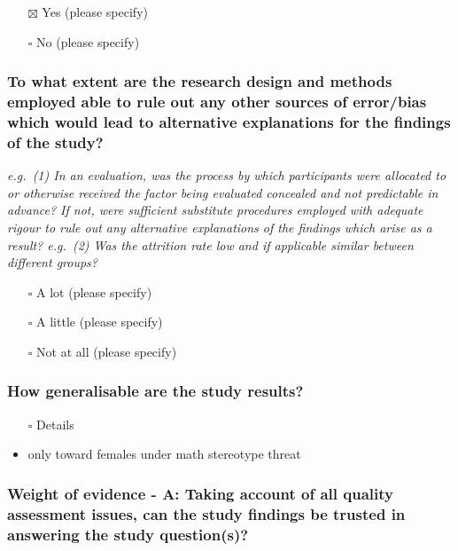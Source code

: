 \documentclass[
  doc, a4paper]{apa7}
\providecommand{\tightlist}{%
  \setlength{\itemsep}{0pt}\setlength{\parskip}{0pt}}
\begin{document}
\begin{itemize}
\tightlist
\item[$\boxtimes$]
  Yes (please specify)
\item[$\square$]
  No (please specify)
\end{itemize}

\subsubsection{To what extent are the research design and methods employed able to rule out any other sources of error/bias which would lead to alternative explanations for the findings of the study?}\label{to-what-extent-are-the-research-design-and-methods-employed-able-to-rule-out-any-other-sources-of-errorbias-which-would-lead-to-alternative-explanations-for-the-findings-of-the-study}

\emph{e.g.~(1) In an evaluation, was the process by which participants were allocated to or otherwise received the factor being evaluated concealed and not predictable in advance? If not, were sufficient substitute procedures employed with adequate rigour to rule out any alternative explanations of the findings which arise as a result? e.g.~(2) Was the attrition rate low and if applicable similar between different groups?}

\begin{itemize}
\tightlist
\item[$\square$]
  A lot (please specify)
\item[$\square$]
  A little (please specify)
\item[$\square$]
  Not at all (please specify)
\end{itemize}

\subsubsection{How generalisable are the study results?}\label{how-generalisable-are-the-study-results}

\begin{itemize}
\item[$\square$]
  Details
\item
  only toward females under math stereotype threat
\end{itemize}

\subsubsection{Weight of evidence - A: Taking account of all quality assessment issues, can the study findings be trusted in answering the study question(s)?}\label{weight-of-evidence---a-taking-account-of-all-quality-assessment-issues-can-the-study-findings-be-trusted-in-answering-the-study-questions}
\end{document}
